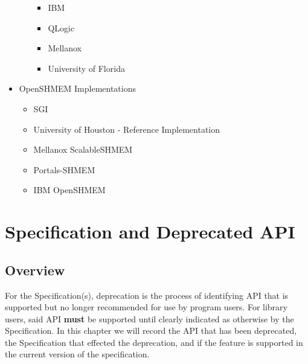 \begin{itemize}
\begin{itemize}
\begin{itemize}
    \item IBM
    \item QLogic
    \item Mellanox
    \item University of Florida
    \end{itemize}
  \end{itemize}
\item OpenSHMEM Implementations 
 \begin{itemize}
  \item SGI \openshmem
  \item University of Houston - \openshmem Reference Implementation
  \item Mellanox ScalableSHMEM
  \item Portals-SHMEM
  \item IBM OpenSHMEM
  \end{itemize}
\end{itemize}








\chapter{\openshmem Specification and Deprecated API}\label{sec:dep_api}

\section{Overview}\label{subsec:dep_overview}
For the \openshmem Specification(s), deprecation is the process of identifying
API that is supported but no longer recommended for use by program users. For
\openshmem library users, said API \textbf{must} be supported until clearly
indicated as otherwise by the Specification. In this chapter we will record the
API that has been deprecated, the \openshmem Specification that effected the
deprecation, and if the feature is supported in the current version of the
specification.  

